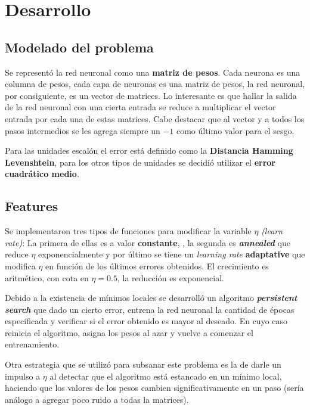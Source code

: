 \documentclass[%
    final,
    reprint,
    notitlepage,
    narroweqnarray,
    inline,
    twoside,
    invited
    ]{ieee}
\begin{document}

\section{Desarrollo}

\subsection{Modelado del problema}

\par Se representó la red neuronal como una \textbf{matriz de pesos}. Cada neurona es una columna de pesos, cada capa de 
neuronas es una matriz de pesos, la red neuronal, por consiguiente, es un vector de matrices. Lo interesante es que hallar 
la salida de la red neuronal con una cierta entrada se reduce a multiplicar el vector entrada por cada una de estas matrices. Cabe destacar 
que al vector y a todos los pasos intermedios se les agrega siempre un $-1$ como último valor para el sesgo.\\

\par Para las unidades escalón el error está definido como la \textbf{Distancia Hamming Levenshtein}, para los 
otros tipos de unidades se decidió utilizar el \textbf{error cuadrático medio}.

\subsection{Features}

\par Se implementaron tres tipos de funciones para modificar la variable $\eta$ \textit{(learn rate)}: 
La primera de ellas es a valor \textbf{constante}, , la segunda es \textbf{\textit{annealed}} que reduce $\eta$ exponencialmente y por último se 
tiene un \textit{learning rate} \textbf{adaptative} que modifica $\eta$ en función de los últimos errores obtenidos. El crecimiento es aritmético, con cota 
en $\eta =0.5$, la reducción es exponencial.

\par Debido a la existencia de mínimos locales se desarrolló un algoritmo  \textbf{\textit{persistent search}} que dado un cierto error, entrena
 la red neuronal la cantidad de épocas especificada y verificar si el error obtenido es mayor al deseado. En cuyo caso 
reinicia el algoritmo, asigna los pesos al azar y vuelve a comenzar el entrenamiento.
\par Otra estrategia que se utilizó para subsanar este problema es la de darle un impulso a $\eta$ al detectar que el algoritmo está estancado 
en un mínimo local, haciendo que los valores de los pesos cambien significativamente en un paso (sería análogo a agregar poco ruido a todas la matrices).
\end{document}

